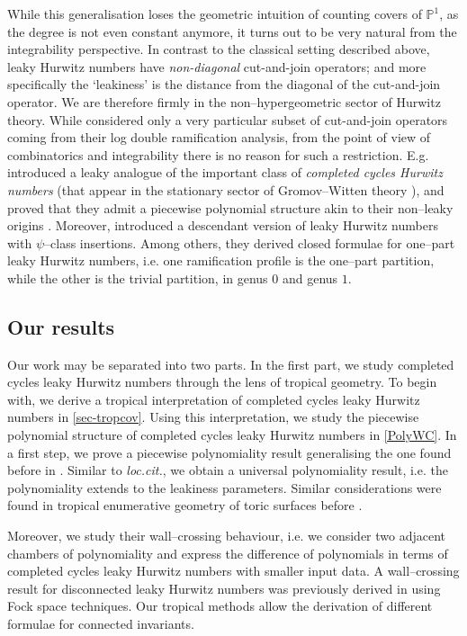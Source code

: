 \documentclass[10pt,a4paper,oneside,no-math,reqno]{amsart}%
\theoremstyle{plain}
\theoremstyle{definition}
\theoremstyle{remark}
\numberwithin{equation}{section}
\newcommand{\mb}[1]{\mathbb{#1}}
\newcommand{\1}{\mathds{1}}
\renewcommand{\P}{\mb{P}}
\newcommand{\<}{\langle}
\renewcommand{\>}{\rangle}
\begin{document}
While this generalisation loses the geometric intuition of counting covers of $ \P^1$, as the degree is not even constant anymore, it turns out to be very natural from the integrability perspective. In contrast to the classical setting described above, leaky Hurwitz numbers  have \emph{non-diagonal} cut-and-join operators; and more specifically the `leakiness' is the distance from the diagonal of the cut-and-join operator. We are therefore firmly in the non--hypergeometric sector of Hurwitz theory. While \cite{CMR25} considered only a very particular subset of cut-and-join operators coming from their log double ramification analysis, from the point of view of combinatorics and integrability there is no reason for such a restriction. E.g. \cite{AKL25} introduced a leaky analogue of the important class of \emph{completed cycles Hurwitz numbers} (that appear in the stationary sector of Gromov--Witten theory \cite{OP06a}), and proved that they admit a piecewise polynomial structure akin to their non--leaky origins \cite{SSZ12}. Moreover, \cite{cavalieri2025k,CMS25} introduced a descendant version of leaky Hurwitz numbers with $\psi$--class insertions. Among others, they derived closed formulae for one--part leaky Hurwitz numbers, i.e. one ramification profile is the one--part partition, while the other is the trivial partition, in genus $0$ and genus $1$.


\subsection{Our results}
Our work may be separated into two parts. In the first part, we study completed cycles leaky Hurwitz numbers through the lens of tropical geometry. To begin with, we derive a tropical interpretation of completed cycles leaky Hurwitz numbers in \cref{sec-tropcov}. Using this interpretation, we study the piecewise polynomial structure of completed cycles leaky Hurwitz numbers in \cref{PolyWC}. In a first step, we prove a piecewise polynomiality result generalising the one found before in \cite{AKL25}. Similar to \emph{loc.cit.}, we obtain a universal polynomiality result, i.e. the polynomiality extends to the leakiness parameters. Similar considerations were found in tropical enumerative geometry of toric surfaces before \cite{ardila2012universal,hahn2024universal}. 

Moreover, we study their wall--crossing behaviour, i.e. we consider two adjacent chambers of polynomiality and express the difference of polynomials in terms of completed cycles leaky Hurwitz numbers with smaller input data. A wall--crossing result for disconnected leaky Hurwitz numbers was previously derived in \cite{AKL25} using Fock space techniques. Our tropical methods allow the derivation of different formulae for connected invariants.
\end{document}
